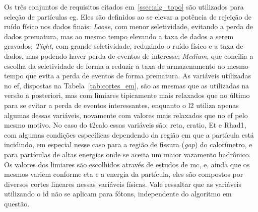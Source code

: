 
Os três conjuntos de requisitos citados em~\ref{ssec:alg_topo} são utilizados para 
seleção de partículas \gls{eg}. Eles são definidos ao se elevar a potência de rejeição 
de ruído físico nos dados finais: \emph{Loose}, com menor seletividade, 
evitando a perda de dados prematura, mas ao mesmo tempo elevando a taxa de dados 
a serem gravados; \emph{Tight}, com grande seletividade, reduzindo o
ruído físico e a taxa de dados, mas podendo haver perda de eventos de interesse;
\emph{Medium}, que concilia a escolha da seletividade de forma
a reduzir a taxa de armazenamento ao mesmo tempo que evita a perda de eventos
de forma prematura. As variáveis utilizadas no \gls{ef}, dispostas na
Tabela~\ref{tab:cortes_em}, são as mesmas que as
utilizadas na versão a posteriori, mas com limiares tipicamente mais relaxados
que no último para se evitar a perda de eventos interessantes, enquanto o
\gls{l2} utiliza apenas algumas dessas variáveis, novamente com valores mais relaxados que no 
\gls{ef} pelo mesmo motivo. No caso do \gls{t2calo} essas variáveis são: \gls{reta}, 
\gls{eratio}, \gls{Et} e \gls{Rhad1}, com algumas condições específicas 
dependendo da região em que a partícula está incidindo, em especial nesse 
caso para a região de fissura (\emph{gap}) do calorímetro, e para partículas de altas energias onde se aceita um maior
vazamento hadrônico. Os valores dos limiares são escolhidos através de estudos
de \gls{mc}, e, ainda que os mesmos variem conforme \gls{eta} e a energia da
partícula, eles são compostos por diversos cortes lineares nessas variáveis
físicas. Vale ressaltar que as variáveis utilizando o \gls{id} 
não se aplicam para fótons, independente do algoritmo em questão.


